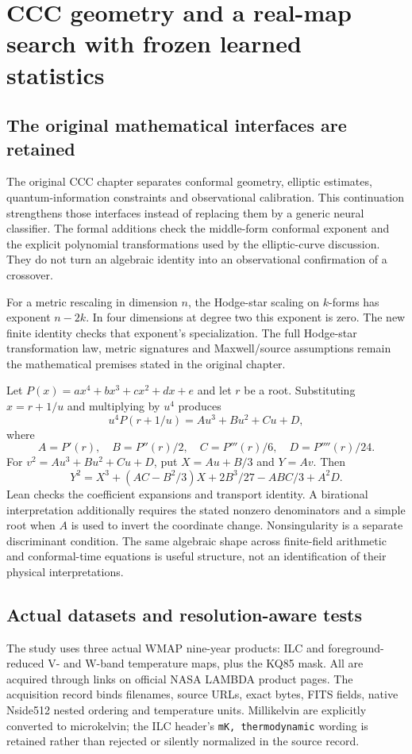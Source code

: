 \chapter{CCC geometry and a real-map search with frozen learned statistics}
\label{ch:p3-ccc}

\section{The original mathematical interfaces are retained}

The original CCC chapter separates conformal geometry, elliptic estimates, quantum-information constraints and observational calibration. This continuation strengthens those interfaces instead of replacing them by a generic neural classifier. The formal additions check the middle-form conformal exponent and the explicit polynomial transformations used by the elliptic-curve discussion. They do not turn an algebraic identity into an observational confirmation of a crossover.

For a metric rescaling in dimension $n$, the Hodge-star scaling on $k$-forms has exponent $n-2k$. In four dimensions at degree two this exponent is zero. The new finite identity checks that exponent's specialization. The full Hodge-star transformation law, metric signatures and Maxwell/source assumptions remain the mathematical premises stated in the original chapter.

Let $P(x)=ax^4+bx^3+cx^2+dx+e$ and let $r$ be a root. Substituting $x=r+1/u$ and multiplying by $u^4$ produces
\[
 u^4P(r+1/u)=Au^3+Bu^2+Cu+D,
\]
where
\[
 A=P'(r),\quad B=P''(r)/2,\quad C=P'''(r)/6,\quad D=P''''(r)/24.
\]
For $v^2=Au^3+Bu^2+Cu+D$, put $X=Au+B/3$ and $Y=Av$. Then
\[
 Y^2=X^3+(AC-B^2/3)X+2B^3/27-ABC/3+A^2D.
\]
Lean checks the coefficient expansions and transport identity. A birational interpretation additionally requires the stated nonzero denominators and a simple root when $A$ is used to invert the coordinate change. Nonsingularity is a separate discriminant condition. The same algebraic shape across finite-field arithmetic and conformal-time equations is useful structure, not an identification of their physical interpretations.

\section{Actual datasets and resolution-aware tests}

The study uses three actual WMAP nine-year products: ILC and foreground-reduced V- and W-band temperature maps, plus the KQ85 mask. All are acquired through links on official NASA LAMBDA product pages. The acquisition record binds filenames, source URLs, exact bytes, FITS fields, native Nside512 nested ordering and temperature units. Millikelvin are explicitly converted to microkelvin; the ILC header's \texttt{mK, thermodynamic} wording is retained rather than rejected or silently normalized in the source record.

